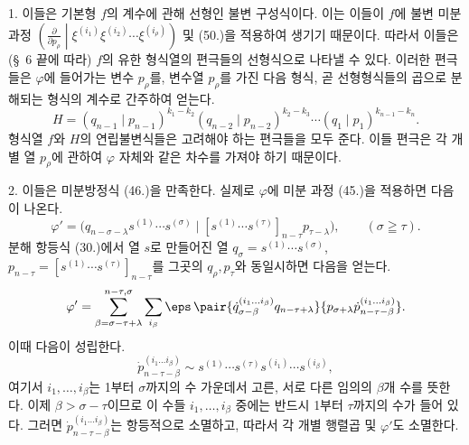 
1. 이들은 기본형 $f$의 계수에 관해 선형인 불변 구성식이다. 이는 이들이 $f$에 불변 미분 과정 $\left(\frac{\partial}{\partial p_\rho}\middle|\xi^{(i_1)}\xi^{(i_2)}\cdots\xi^{(i_\rho)}\right)$ 및 (50.)을 적용하여 생기기 때문이다. 따라서 이들은(\S\ 6 끝에 따라) $f$의 유한 형식열의 편극들의 선형식으로 나타낼 수 있다. 이러한 편극들은 $\varphi$에 들어가는 변수 $p_\rho$를, 변수열 $p_\rho$를 가진 다음 형식, 곧 선형형식들의 곱으로 분해되는 형식의 계수로 간주하여 얻는다.
\begin{equation}
 H=(q_{n-1}\mid p_{n-1})^{k_1-k_2}(q_{n-2}\mid p_{n-2})^{k_2-k_3}\cdots(q_1\mid p_1)^{k_{n-1}-k_n}.
\tag{52}
\end{equation}
형식열 $f$와 $H$의 연립불변식들은 고려해야 하는 편극들을 모두 준다. 이들 편극은 각 개별 열 $p_\rho$에 관하여 $\varphi$ 자체와 같은 차수를 가져야 하기 때문이다.

2. 이들은 미분방정식 (46.)을 만족한다. 실제로 $\varphi$에 미분 과정 (45.)을 적용하면 다음이 나온다.
\[
 \varphi'=\bigl(q_{n-\sigma-\lambda}s^{(1)}\cdots s^{(\sigma)}\mid [s^{(1)}\cdots s^{(\tau)}]_{n-\tau}p_{\tau-\lambda}\bigr),\qquad (\sigma\geqq\tau).
\]
분해 항등식 (30.)에서 열 $s$로 만들어진 열 $q_\sigma=s^{(1)}\cdots s^{(\sigma)}$, $p_{n-\tau}=[s^{(1)}\cdots s^{(\tau)}]_{n-\tau}$를 그곳의 $q_\rho,p_\tau$와 동일시하면 다음을 얻는다.
\[
 \varphi'=\sum_{\beta=\sigma-\tau+\lambda}^{n-\tau,\sigma}\sum_{i_\beta}\eps\,
 \pair{\dot{q}_{\sigma-\beta}^{(i_1\ldots i_\beta)}q_{n-\tau+\lambda}}{p_{\sigma+\lambda}\dot{p}_{n-\tau-\beta}^{(i_1\ldots i_\beta)}}.
\]
이때 다음이 성립한다.
\[
 \dot{p}_{n-\tau-\beta}^{(i_1\ldots i_\beta)}\sim s^{(1)}\cdots s^{(\tau)}s^{(i_1)}\cdots s^{(i_\beta)},
\]
여기서 $i_1,\ldots,i_\beta$는 1부터 $\sigma$까지의 수 가운데서 고른, 서로 다른 임의의 $\beta$개 수를 뜻한다. 이제 $\beta>\sigma-\tau$이므로 이 수들 $i_1,\ldots,i_\beta$ 중에는 반드시 1부터 $\tau$까지의 수가 들어 있다. 그러면 $\dot{p}_{n-\tau-\beta}^{(i_1\ldots i_\beta)}$는 항등적으로 소멸하고, 따라서 각 개별 행렬곱 및 $\varphi'$도 소멸한다.

